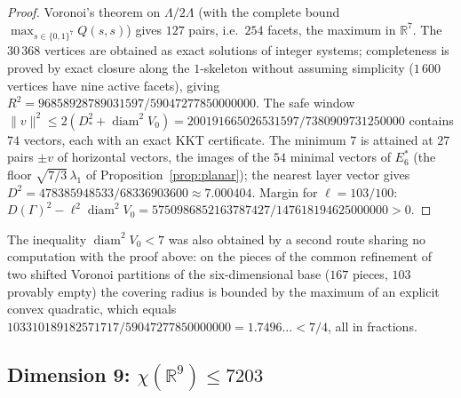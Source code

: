 \documentclass[10pt]{article}
\theoremstyle{plain}
\theoremstyle{remark}
\newcommand{\R}{\mathbb{R}}
\newcommand{\diam}{\operatorname{diam}}
\begin{document}
\begin{proof}
Voronoi's theorem on $\Lambda/2\Lambda$ (with the complete bound
$\max_{s\in\{0,1\}^7}Q(s,s)$) gives $127$ pairs, i.e.\ $254$ facets, the
maximum in $\R^7$. The $30\,368$ vertices are obtained as exact solutions of
integer systems; completeness is proved by exact closure along the
$1$-skeleton without assuming simplicity ($1\,600$ vertices have nine active
facets), giving $R^2=96858928789031597/59047277850000000$. The safe window
$\|v\|^2\le2(D_*^2+\diam^2V_0)=200191665026531597/7380909731250000$ contains
$74$ vectors, each with an exact KKT certificate. The minimum $7$ is attained
at $27$ pairs $\pm v$ of horizontal vectors, the images of the $54$ minimal
vectors of $E_6^*$ (the floor $\sqrt{7/3}\,\lambda_1$ of
Proposition~\ref{prop:planar}); the nearest layer vector gives
$D^2=478385948533/68336903600\approx7.000404$. Margin for $\ell=103/100$:
$D(\Gamma)^2-\ell^2\diam^2V_0=5750986852163787427/147618194625000000>0$.
\end{proof}

The inequality $\diam^2V_0<7$ was also obtained by a second route sharing no
computation with the proof above: on the pieces of the common refinement of
two shifted Voronoi partitions of the six-dimensional base ($167$ pieces,
$103$ provably empty) the covering radius is bounded by the maximum of an
explicit convex quadratic, which equals
$103310189182571717/59047277850000000=1.7496\ldots<7/4$, all in fractions.

\subsection{Dimension 9: $\chi(\R^9)\le7203$}\label{ssec:7203}
\end{document}
